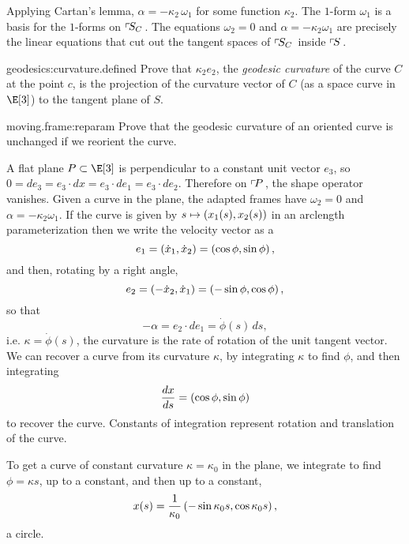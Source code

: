 Applying Cartan's lemma, \(\alpha=-\kappa_2 \, \omega_1\) for some function \(\kappa_2\).
The \(1\)-form \(\omega_1\) is a basis for the \(1\)-forms on \(\adaptedFrameBundle{C}{S}\). 
The equations \(\omega_2=0\) and \(\alpha=-\kappa_2 \omega_1\) are precisely the linear equations that cut out the tangent spaces of \(\adaptedFrameBundle{C}{S}\) inside \(\frameBundle{S}\).
\begin{problem}{geodesics:curvature.defined}
Prove that \(\kappa_2 e_2\), the \emph{geodesic curvature}%
of the curve \(C\) at the point \(c\), is the projection of the curvature vector of \(C\) (as a space curve in \(\E[3]\)) to the tangent plane of \(S\).
\end{problem}
\begin{problem}{moving.frame:reparam}
Prove that the geodesic curvature of an oriented curve is unchanged if we reorient the curve.
\end{problem}
\begin{example} A flat plane \(P \subset \E[3]\) is perpendicular to a constant unit vector \(e_3\), so \(0=de_3=e_3 \cdot dx=e_3 \cdot de_1 = e_3 \cdot de_2\).
Therefore on \(\frameBundle{P}\), the shape operator vanishes.
Given a curve in the plane, the adapted frames have \(\omega_2=0\) and \(\alpha = -\kappa_2 \omega_1\).
If the curve is given by \(s \mapsto \pr{x_1(s),x_2(s)}\) in an arclength parameterization then we write the velocity vector as a 
\[
e_1 = \pr{\dot{x}_1,\dot{x}_2}=\pr{\cos \phi, \sin \phi},
\] 
and then, rotating by a right angle, 
\[
e_2 = \pr{-\dot{x}_2,\dot{x}_1}=\pr{-\sin \phi, \cos \phi},
\]
so that
\[
-\alpha=e_2 \cdot de_1 = \dot{\phi}(s) \, ds,
\]
i.e. \(\kappa = \dot{\phi}(s)\), the curvature is the rate of rotation of the unit tangent vector.
We can recover a curve from its curvature \(\kappa\), by integrating \(\kappa\) to find \(\phi\), and then integrating 
\[
\frac{dx}{ds} = \pr{\cos \phi, \sin \phi}
\]
to recover the curve.
Constants of integration represent rotation and translation of the curve.
\end{example}
\begin{example} 
To get a curve of constant curvature \(\kappa=\kappa_0\) in the plane, we integrate to find \(\phi = \kappa s\), up to a constant, and then up to a constant,
\[
x(s)=\frac{1}{\kappa_0} \pr{-\sin \kappa_0s, \cos \kappa_0 s},
\]
a circle.
\end{example}
